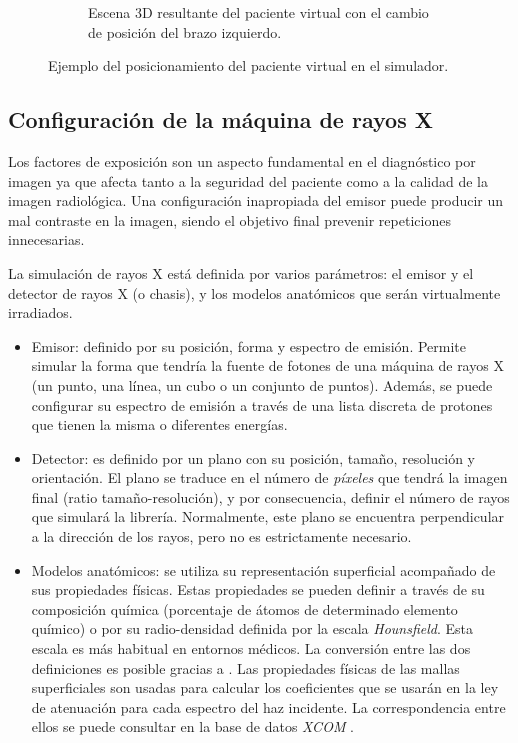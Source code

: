 \begin{figure}[h]
\begin{subfigure}[b]{0.45\linewidth}
        \caption{Escena 3D resultante del paciente virtual con el cambio de posición del brazo izquierdo.\label{subfig:US-B}}
    \end{subfigure}
    \caption{\label{fig:pose} Ejemplo del posicionamiento del paciente virtual en el simulador.}
   \end{figure}



\subsection{Configuración de la máquina de rayos X}
\label{xray:setupxray}

Los factores de exposición son un aspecto fundamental en el diagnóstico por imagen ya que afecta tanto a la seguridad del paciente como a la calidad de la imagen radiológica. Una configuración inapropiada del emisor puede producir un mal contraste en la imagen, siendo el objetivo final prevenir repeticiones innecesarias.

La simulación de rayos X está definida por varios parámetros: el emisor y el detector de rayos X (o chasis), y los modelos anatómicos que serán virtualmente irradiados. 
\begin{itemize}
    \item Emisor: definido por su posición, forma y espectro de emisión. Permite simular la forma que tendría la fuente de fotones de una máquina de rayos X (un punto, una línea, un cubo o un conjunto de puntos). Además, se puede configurar su espectro de emisión a través de una lista discreta de protones que tienen la misma o diferentes energías.
    \item Detector: es definido por un plano con su posición, tamaño, resolución y orientación. El plano se traduce en el número de \emph{píxeles} que tendrá la imagen final (ratio tamaño-resolución), y por consecuencia, definir el número de rayos que simulará la librería. Normalmente, este plano se encuentra perpendicular a la dirección de los rayos, pero no es estrictamente necesario.
    \item Modelos anatómicos: se utiliza su representación superficial acompañado de sus propiedades físicas. Estas propiedades se pueden definir a través de su composición química (porcentaje de átomos de determinado elemento químico) o por su radio-densidad definida por la escala \emph{Hounsfield}. Esta escala es más habitual en entornos médicos. La conversión entre las dos definiciones es posible gracias a \cite{Schneider2000}. Las propiedades físicas de las mallas superficiales son usadas para calcular los coeficientes que se usarán en la ley de atenuación para cada espectro del haz incidente. La correspondencia entre ellos se puede consultar en la base de datos \emph{XCOM} \cite{XCOM}.
\end{itemize}

